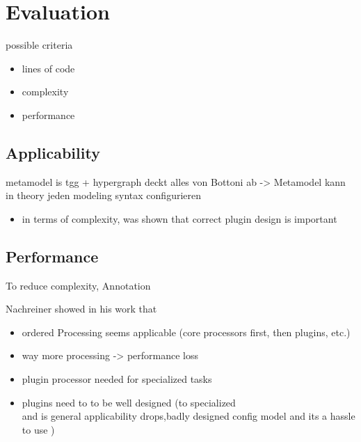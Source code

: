 \chapter{Evaluation}

possible criteria
\begin{itemize}
  \item lines of code
  \item complexity
  \item performance
\end{itemize}

\section{Applicability}
metamodel is tgg + hypergraph deckt alles von Bottoni ab -> Metamodel kann in theory jeden modeling syntax configurieren

\begin{itemize}
  \item in terms of complexity, was shown that correct plugin design is important
\end{itemize}


\section{Performance}
To reduce complexity, Annotation



Nachreiner showed in his work \cite{nachreiner_couchedit_2020} that 



\begin{itemize}
  \item ordered Processing seems applicable (core processors first, then plugins, etc.)
  \item way more processing -> performance loss
  \item plugin processor needed for specialized tasks
  \item plugins need to to be well designed (to specialized\\
        and is general applicability drops,badly designed config model and its a hassle to use )
\end{itemize}

